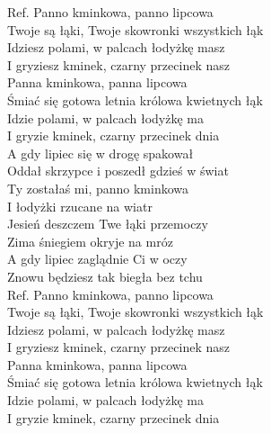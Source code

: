 \hops
Ref. Panno kminkowa, panno lipcowa\\
 Twoje są łąki, Twoje skowronki wszystkich łąk \\
 Idziesz polami, w palcach łodyżkę masz \\
 I gryziesz kminek, czarny przecinek nasz \\
\hops
{} Panna kminkowa, panna lipcowa \\
 Śmiać się gotowa letnia królowa kwietnych łąk \\
 Idzie polami, w palcach łodyżkę ma \\
 I gryzie kminek, czarny przecinek dnia \\
\hops
A gdy lipiec się w drogę spakował \\
Oddał skrzypce i poszedł gdzieś w świat \\
Ty zostałaś mi, panno kminkowa \\
I łodyżki rzucane na wiatr \\
\hops
Jesień deszczem Twe łąki przemoczy \\
Zima śniegiem okryje na mróz \\
A gdy lipiec zaglądnie Ci w oczy \\
Znowu będziesz tak biegła bez tchu \\
\hops
Ref. Panno kminkowa, panno lipcowa\\
 Twoje są łąki, Twoje skowronki wszystkich łąk \\
 Idziesz polami, w palcach łodyżkę masz \\
 I gryziesz kminek, czarny przecinek nasz \\
\hops
{} Panna kminkowa, panna lipcowa \\
 Śmiać się gotowa letnia królowa kwietnych łąk \\
 Idzie polami, w palcach łodyżkę ma \\
 I gryzie kminek, czarny przecinek dnia